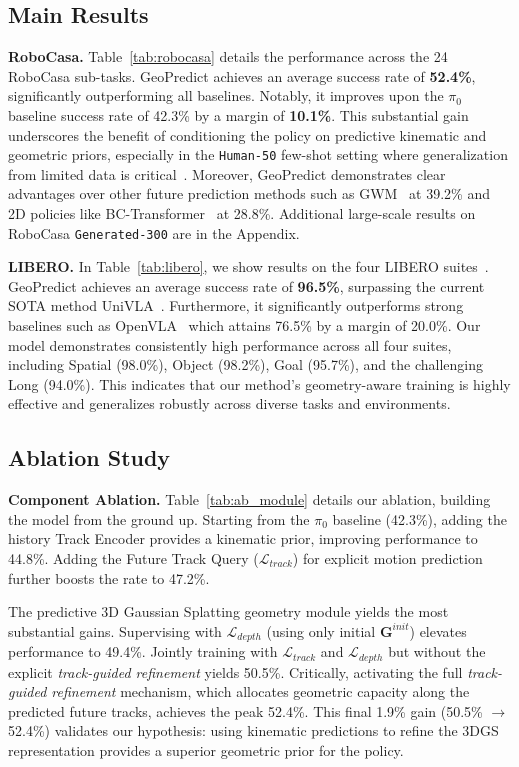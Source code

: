 \subsection{Main Results} \label{sec:main_results}

\noindent \textbf{RoboCasa.}
Table~\ref{tab:robocasa} details the performance across the 24 RoboCasa sub-tasks. GeoPredict achieves an average success rate of \textbf{52.4\%}, significantly outperforming all baselines. Notably, it improves upon the $\pi_0$ baseline success rate of 42.3\% by a margin of \textbf{10.1\%}. This substantial gain underscores the benefit of conditioning the policy on predictive kinematic and geometric priors, especially in the \texttt{Human-50} few-shot setting where generalization from limited data is critical~\cite{nasiriany2024robocasa}. Moreover, GeoPredict demonstrates clear advantages over other future prediction methods such as GWM~\cite{lu2025gwm} at 39.2\% and 2D policies like BC-Transformer~\cite{nasiriany2024robocasa} at 28.8\%. Additional large-scale results on RoboCasa \texttt{Generated-300} are in the Appendix.




\noindent \textbf{LIBERO.}
In Table~\ref{tab:libero}, we show results on the four LIBERO suites~\cite{liu2023libero}. GeoPredict achieves an average success rate of \textbf{96.5\%}, surpassing the current SOTA method UniVLA~\cite{bu2025univla}. Furthermore, it significantly outperforms strong baselines such as OpenVLA~\cite{kim2025openvla} which attains 76.5\% by a margin of 20.0\%. Our model demonstrates consistently high performance across all four suites, including Spatial (98.0\%), Object (98.2\%), Goal (95.7\%), and the challenging Long (94.0\%). This indicates that our method's geometry-aware training is highly effective and generalizes robustly across diverse tasks and environments.


\subsection{Ablation Study} \label{sec:ablations}
\noindent \textbf{Component Ablation.}
Table~\ref{tab:ab_module} details our ablation, building the model from the ground up. Starting from the $\pi_0$ baseline (42.3\%), adding the history Track Encoder provides a kinematic prior, improving performance to 44.8\%. Adding the Future Track Query ($\mathcal{L}_{track}$) for explicit motion prediction further boosts the rate to 47.2\%.

The predictive 3D Gaussian Splatting geometry module yields the most substantial gains. Supervising with $\mathcal{L}_{depth}$ (using only initial $\mathbf{G}^{init}$) elevates performance to 49.4\%. Jointly training with $\mathcal{L}_{track}$ and $\mathcal{L}_{depth}$ but without the explicit \textit{track-guided refinement} yields 50.5\%. Critically, activating the full \textit{track-guided refinement} mechanism, which allocates geometric capacity along the predicted future tracks, achieves the peak 52.4\%. This final 1.9\% gain (50.5\% $\to$ 52.4\%) validates our hypothesis: using kinematic predictions to refine the 3DGS representation provides a superior geometric prior for the policy.

